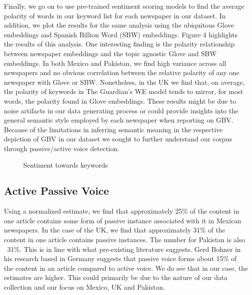 \documentclass{article}
\begin{document}
{{Finally, we go on to use pre-trained sentiment scoring models to find the average polarity of words in our keyword list for each newspaper in our dataset. In addition, we plot the results for the same analysis using the ubiquitous Glove embeddings and Spanish Billion Word (SBW) embeddings. Figure 4 highlights the results of this analysis. One interesting finding is the polarity relationship between newspaper embeddings and the topic agnostic Glove and SBW embeddings. In both Mexico and Pakistan, we find high variance across all newspapers and no obvious correlation between the relative polarity of any one newspaper with Glove or SBW. Nonetheless, in the UK we find that, on average, the polarity of keywords in The Guardian’s WE model tends to mirror, for most words, the polarity found in Glove embeddings. These results might be due to noise artifacts in our data generating process or could provide insights into the general semantic style employed by each newspaper when reporting on GBV. Because of the limitations in inferring semantic meaning in the respective depiction of GBV in our dataset we sought to further understand our corpus through passive/active voice detection.

\begin{figure}[H]
	\caption{\label{fig:my-label1} Sentiment towards keywords}
\end{figure}

}


\subsection{Active Passive Voice}{


Using a normalized estimate, we find that approximately 25\% of the content in one article contains some form of passive instance associated with it in Mexican newspapers. In the case of the UK, we find that approximately 31\% of the content in one article contains passive instances. The number for Pakistan is also ~31\%. This is in line with what pre-existing literature suggests. Gerd Bohner in his research based in Germany suggests that passive voice forms about 15\% of the content in an article compared to active voice. We do see that in our case, the estimates are higher. This could primarily be due to the nature of our data collection and our focus on Mexico, UK and Pakistan.

}}
\end{document}

